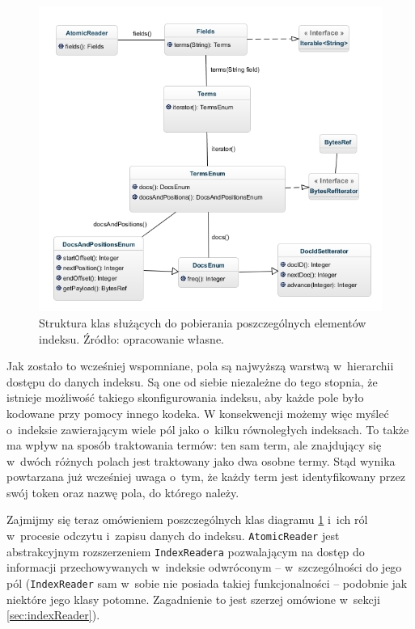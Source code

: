 \begin{figure}[here]
 \includegraphics[scale=0.64]{pictures/LuceneAccessAPI_1.jpg}
 \caption{Struktura klas służących do pobierania poszczególnych elementów indeksu. Źródło: opracowanie własne.\label{fig:indexApi}}
\end{figure}

Jak zostało to wcześniej wspomniane, pola są najwyższą warstwą w~hierarchii dostępu do danych indeksu. Są one od siebie niezależne do tego stopnia, że istnieje możliwość takiego skonfigurowania indeksu, aby każde pole było kodowane przy pomocy innego kodeka. W konsekwencji możemy więc myśleć o~indeksie zawierającym wiele pól jako o~kilku równoległych indeksach. To także ma wpływ na sposób traktowania termów: ten sam term, ale znajdujący się w~dwóch różnych polach jest traktowany jako dwa osobne termy. Stąd wynika powtarzana już wcześniej uwaga o~tym, że każdy term jest identyfikowany przez swój token oraz nazwę pola, do którego należy.

Zajmijmy się teraz omówieniem poszczególnych klas diagramu \ref{fig:indexApi} i~ich ról w~procesie odczytu i~zapisu danych do indeksu. \texttt{AtomicReader} jest abstrakcyjnym rozszerzeniem \texttt{IndexReadera} pozwalającym na dostęp do informacji przechowywanych w~indeksie odwróconym -- w~szczególności do jego pól (\texttt{IndexReader} sam w~sobie nie posiada takiej funkcjonalności -- podobnie jak niektóre jego klasy potomne. Zagadnienie to jest szerzej omówione w~sekcji \ref{sec:indexReader}). 

